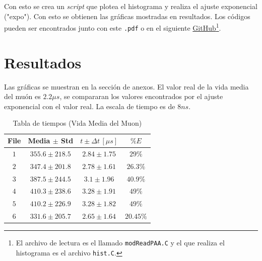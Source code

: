 \documentclass[conference]{IEEEtran}
\begin{document}
Con esto se crea un \textit{script} que plotea el histograma y realiza el ajuste exponencial ("expo"). Con esto se obtienen las gráficas mostradas en resultados. Los códigos pueden ser encontrados junto con este \texttt{.pdf} o en el siguiente \href{https://github.com/DSarceno/Semestre9/blob/master/Laboratorio\%20Avanzado/Vida_media_muon/Codigos}{GitHub}\footnote{El archivo de lectura es el llamado \texttt{modReadPAA.C} y el que realiza el histograma es el archivo \texttt{hist.C}.}.
        
        
        
        
\section{Resultados}
    Las gráficas se muestran en la sección de anexos. El valor real de la vida media del muón es $2.2\mu s$, se compararan los valores encontrados por el ajuste exponencial con el valor real. La escala de tiempo es de $8ns$.
    \begin{table}[H]
    	\centering
    	\caption{Tabla de tiempos (Vida Media del Muon)}
		\label{table:tiempos}
		\begin{tabular}{||c||c|c|c||}
			\hline
			\hline
			File & Media $\pm$ Std   & $t\pm \Delta t\, [\mu s]$ & $\% E$      \\
			\hline
			\hline
			$1$    & $355.6 \pm 218.5$ & $2.84 \pm 1.75$         & $29\%$    \\
			$2$    & $347.4 \pm 201.8$ & $2.78\pm 1.61$          & $26.3\%$  \\
			$3$    & $387.5 \pm 244.5$ & $3.1\pm 1.96$           & $40.9\%$  \\
			$4$    & $410.3\pm 238.6$  & $3.28\pm 1.91$          & $49\%$    \\
			$5$    & $410.2\pm 226.9$  & $3.28\pm 1.82$          & $49\%$    \\
			$6$    & $331.6\pm 205.7$  & $2.65\pm 1.64$          & $20.45\%$ \\
			\hline
			\hline
		\end{tabular}
	\end{table}
    
    
    
\end{document}
